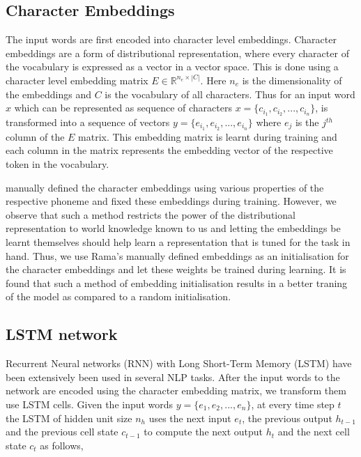 \documentclass[11pt,letterpaper]{article}
\begin{document}
\subsection{Character Embeddings}

The input words are first encoded into character level embeddings. Character embeddings are a form of distributional representation, where every character of the vocabulary is expressed as a vector in a vector space. This is done using a character level embedding matrix $E \in \mathbb{R}^{n_e \times |C|}$. Here $n_e$ is the dimensionality of the embeddings and $C$ is the vocabulary of all characters. Thus for an input word $x$ which can be represented as sequence of characters $x = \{c_{i_1}, c_{i_2}, ..., c_{i_n}\}$, is transformed into a sequence of vectors $y = \{e_{i_1}, e_{i_2}, ..., e_{i_n}\}$ where $e_j$ is the $j^{th}$ column of the $E$ matrix. This embedding matrix is learnt during training and each column in the matrix represents the embedding vector of the respective token in the vocabulary. 

\cite{rama2016siamese} manually defined the character embeddings using various properties of the respective phoneme and fixed these embeddings during training. However, we observe that such a method restricts the power of the distributional representation to world knowledge known to us and letting the embeddings be learnt themselves should help learn a representation that is tuned for the task in hand. Thus, we use Rama's manually defined embeddings as an initialisation for the character embeddings and let these weights be trained during learning. It is found that such a method of embedding initialisation results in a better traning of the model as compared to a random initialisation.

\subsection{LSTM network}

Recurrent Neural networks (RNN) with Long Short-Term Memory (LSTM) have been extensively been used in several NLP tasks. After the input words to the network are encoded using the character embedding matrix, we transform them use LSTM cells. Given the input words $y = \{e_1, e_2, ..., e_n\}$, at every time step $t$ the LSTM of hidden unit size $n_h$ uses the next input $e_t$, the previous output $h_{t-1}$ and the previous cell state $c_{t-1}$ to compute the next output $h_t$ and the next cell state $c_t$ as follows,
\end{document}
